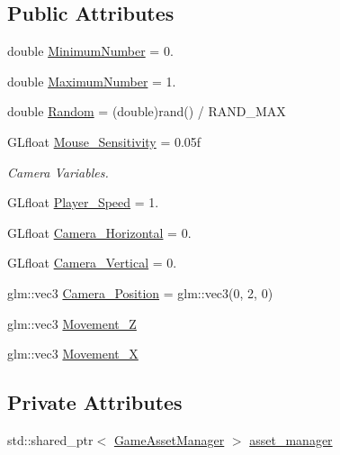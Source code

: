 \subsection*{Public Attributes}
\begin{DoxyCompactItemize}
\item 
double \hyperlink{classGameWorld_a54ccf4cf03172ab8779e9c326c8846ed}{Minimum\+Number} = 0.
\item 
double \hyperlink{classGameWorld_a1cddcf233625a98581eaeb9fd7c8c574}{Maximum\+Number} = 1.
\item 
double \hyperlink{classGameWorld_a56652cc9880b3ba1be61395066c863c3}{Random} = (double)rand() / R\+A\+N\+D\+\_\+\+M\+A\+X
\item 
G\+Lfloat \hyperlink{classGameWorld_a9bf4eb977e6ab9299aaef1345c4fa4dd}{Mouse\+\_\+\+Sensitivity} = 0.\+05f
\begin{DoxyCompactList}\small\item\em Camera Variables. \end{DoxyCompactList}\item 
G\+Lfloat \hyperlink{classGameWorld_ae8ab2ac372729cec44ea316f6bdf45ca}{Player\+\_\+\+Speed} = 1.
\item 
G\+Lfloat \hyperlink{classGameWorld_a7f4911dda9b3b4e4eb03ece87e16cd96}{Camera\+\_\+\+Horizontal} = 0.
\item 
G\+Lfloat \hyperlink{classGameWorld_a26658e739c4d267b1be35ed820089931}{Camera\+\_\+\+Vertical} = 0.
\item 
glm\+::vec3 \hyperlink{classGameWorld_ad80e597474ea4c52a583e81788187571}{Camera\+\_\+\+Position} = glm\+::vec3(0, 2, 0)
\item 
glm\+::vec3 \hyperlink{classGameWorld_a8dd30ba92e7fa9b9b05075e31d1e7dd8}{Movement\+\_\+\+Z}
\item 
glm\+::vec3 \hyperlink{classGameWorld_a968eb29424b68f7cd79a5896c62e944d}{Movement\+\_\+\+X}
\end{DoxyCompactItemize}
\subsection*{Private Attributes}
\begin{DoxyCompactItemize}
\item 
std\+::shared\+\_\+ptr$<$ \hyperlink{classGameAssetManager}{Game\+Asset\+Manager} $>$ \hyperlink{classGameWorld_aec5c0bca4fb5a41e4aac2dce2871266d}{asset\+\_\+manager}
\end{DoxyCompactItemize}


